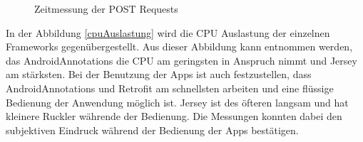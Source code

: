 \begin{figure} [ht]
	\centering
	 \qquad
	 \qquad
	 \qquad
	\caption{Zeitmessung der POST Requests} 
	\label{postRequests}
\end{figure} 

In der Abbildung \ref{cpuAuslastung} wird die CPU Auslastung der einzelnen Frameworks gegenübergestellt. Aus dieser Abbildung kann entnommen werden, das AndroidAnnotations die CPU am geringsten in Anspruch nimmt und Jersey am stärksten. Bei der Benutzung der Apps ist auch festzustellen, dass AndroidAnnotations und Retrofit am schnellsten arbeiten und eine flüssige Bedienung der Anwendung möglich ist. Jersey ist des öfteren langsam und hat kleinere Ruckler währende der Bedienung. Die Messungen konnten dabei den subjektiven Eindruck während der Bedienung der Apps bestätigen.

